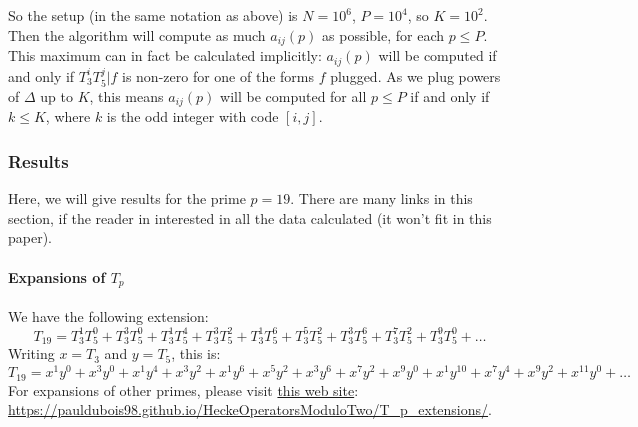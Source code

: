 So the setup (in the same notation as above) is $N=10^6$, $P=10^4$, so $K=10^2$.
Then the algorithm will compute as much $a_{ij}(p)$ as possible, for each $p \leq P$.
This maximum can in fact be calculated implicitly:
$a_{ij}(p)$ will be computed if and only if $T_3^iT_5^j|f$ is non-zero for one of the forms $f$ plugged.
As we plug powers of $\Delta$ up to $K$, this means $a_{ij}(p)$ will be computed for all $p \leq P$ if and only if $k \leq K$, where $k$ is the odd integer with code $[i,j]$.

\subsubsection{Results}
Here, we will give results for the prime $p=19$.
There are many links in this section, if the reader in interested in all the data calculated (it won't fit in this paper).

\paragraph{Expansions of $T_p$}
We have the following extension:
$$
T_{19} = T_3^1T_5^0 + T_3^3T_5^0 + T_3^1T_5^4 + T_3^3T_5^2 + T_3^1T_5^6 + T_3^5T_5^2 + T_3^3T_5^6 + T_3^7T_5^2 + T_3^9T_5^0 + \dots
$$
Writing $x = T_3$ and $y = T_5$, this is:
$$
T_{19} = x^1y^0 + x^3y^0 + x^1y^4 + x^3y^2 + x^1y^6 + x^5y^2 + x^3y^6 + x^7y^2 + x^9y^0 + x^1y^{10} + x^7y^4 + x^9y^2 + x^{11}y^0 + \dots
$$
For expansions of other primes, please visit \href{https://pauldubois98.github.io/HeckeOperatorsModuloTwo/T_p_extensions/}{this web site}:\\ \url{https://pauldubois98.github.io/HeckeOperatorsModuloTwo/T_p_extensions/}.

